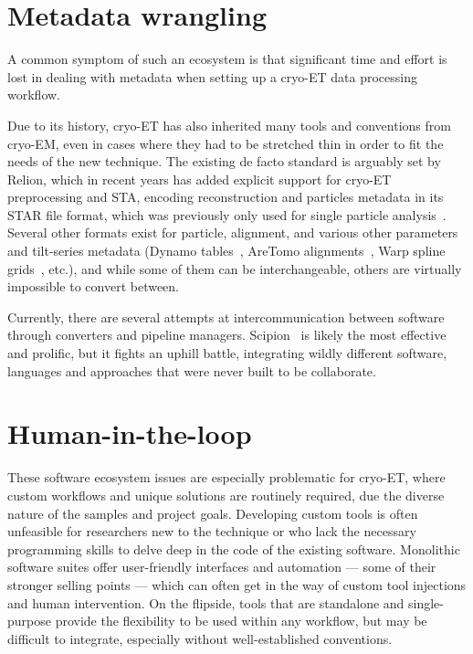 \section{Metadata wrangling}

A common symptom of such an ecosystem is that significant time and effort is lost in dealing with metadata when setting up a cryo-ET data processing workflow.

Due to its history, cryo-ET has also inherited many tools and conventions from cryo-EM, even in cases where they had to be stretched thin in order to fit the needs of the new technique.
The existing de facto standard is arguably set by Relion, which in recent years has added explicit support for cryo-ET preprocessing and STA, encoding reconstruction and particles metadata in its STAR file format, which was previously only used for single particle analysis~\cite{zivanovBayesianApproachSingleparticle2022,burtImageProcessingPipeline2024}.
Several other formats exist for particle, alignment, and various other parameters and tilt-series metadata (Dynamo tables~\cite{castano-diezDynamoCatalogueGeometrical2017}, AreTomo alignments~\cite{zhengAreTomoIntegratedSoftware2022}, Warp spline grids~\cite{tegunovRealtimeCryoelectronMicroscopy2019}, etc.), and while some of them can be interchangeable, others are virtually impossible to convert between.

Currently, there are several attempts at intercommunication between software through converters and pipeline managers.
Scipion~\cite{delarosa-trevinScipionSoftwareFramework2016} is likely the most effective and prolific, but it fights an uphill battle, integrating wildly different software, languages and approaches that were never built to be collaborate.

\section{Human-in-the-loop}

These software ecosystem issues are especially problematic for cryo-ET, where custom workflows and unique solutions are routinely required, due the diverse nature of the samples and project goals.
Developing custom tools is often unfeasible for researchers new to the technique or who lack the necessary programming skills to delve deep in the code of the existing software.
Monolithic software suites offer user-friendly interfaces and automation --- some of their stronger selling points --- which can often get in the way of custom tool injections and human intervention.
On the flipside, tools that are standalone and single-purpose provide the flexibility to be used within any workflow, but may be difficult to integrate, especially without well-established conventions.

